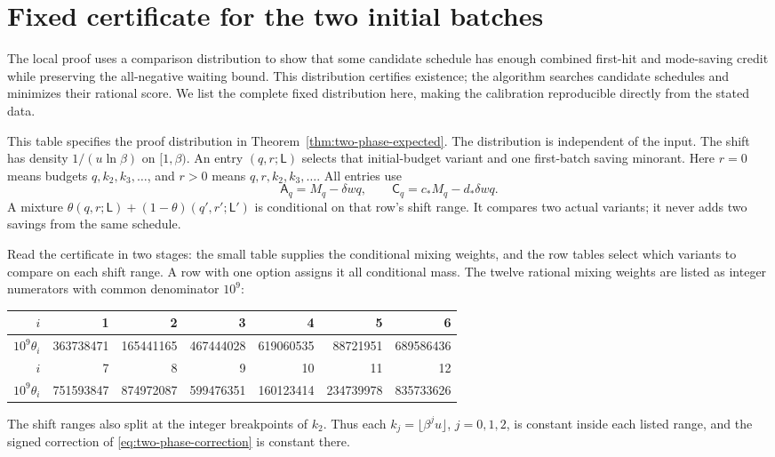\section{Fixed certificate for the two initial batches}
\label{sec:two-phase-certificate}

The local proof uses a comparison distribution to show that some
candidate schedule has enough combined first-hit and mode-saving
credit while preserving the all-negative waiting bound. This
distribution certifies existence; the algorithm searches candidate
schedules and minimizes their rational score. We list the complete
fixed distribution here, making the calibration reproducible directly
from the stated data.

This table specifies the proof distribution in
Theorem~\ref{thm:two-phase-expected}. The distribution is independent
of the input. The shift has density $1/(u\ln\beta)$ on $[1,\beta)$.
An entry $(q,r;\mathsf L)$ selects that initial-budget variant and
one first-batch saving minorant. Here $r=0$ means budgets
$q,k_2,k_3,\ldots$, and $r>0$ means
$q,r,k_2,k_3,\ldots$. All entries use
\[
 \mathsf A_q=M_q-\delta wq,\qquad
 \mathsf C_q=c_*M_q-d_*\delta wq.
\]
A mixture $\theta(q,r;\mathsf L)+(1-\theta)(q',r';\mathsf L')$
is conditional on that row's shift range. It compares two actual
variants; it never adds two savings from the same schedule.

Read the certificate in two stages: the small table supplies the
conditional mixing weights, and the row tables select which variants
to compare on each shift range. A row with one option assigns it
all conditional mass.
The twelve rational mixing weights are listed as integer numerators
with common denominator $10^9$:
\begin{center}
\small
\begin{tabular}{r|rrrrrr}
$i$ &1&2&3&4&5&6\\\hline
$10^9\theta_i$ &
363738471&165441165&467444028&619060535&88721951&689586436\\
$i$ &7&8&9&10&11&12\\\hline
$10^9\theta_i$ &751593847&874972087&599476351&160123414&234739978&835733626\\
\end{tabular}
\end{center}
The shift ranges also split at the integer breakpoints of $k_2$.
Thus each $k_j=\lfloor\beta^j u\rfloor$, $j=0,1,2$, is constant
inside each listed range, and the signed correction of
\eqref{eq:two-phase-correction} is constant there.

